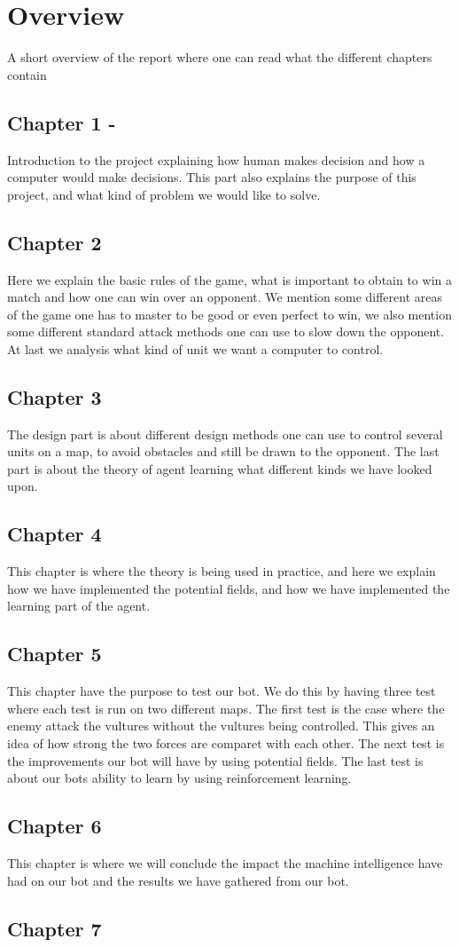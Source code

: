 \section{Overview}
	A short overview of the report where one can read what the different chapters contain

\subsection{Chapter 1 - }
Introduction to the project explaining how human makes decision and how a computer would make decisions. This part also explains the purpose of this project, and what kind of problem we would like to solve.
\subsection{Chapter 2}
Here we explain the basic rules of the game, what is important to obtain to win a match and how one can win over an opponent. We mention some different areas of the game one has to master to be good or even perfect to win, we also mention some different standard attack methods one can use to slow down the opponent. At last we analysis what kind of unit we want a computer to control.
\subsection{Chapter 3}
The design part is about different design methods one can use to control several units on a map, to avoid obstacles and still be drawn to the opponent. The last part is about the theory of agent learning what different kinds we have looked upon.
\subsection{Chapter 4}
This chapter is where the theory is being used in practice, and here we explain how we have implemented the potential fields, and how we have implemented the learning part of the agent.
\subsection{Chapter 5}
This chapter have the purpose to test our bot. We do this by having three test where each test is run on two different maps. The first test is the case
where the enemy attack the vultures without the vultures being controlled. This gives an idea of how strong the two forces are comparet with each other. The next test is the improvements our bot will have by using potential fields. The last test is about our bots ability to learn by using reinforcement learning.
\subsection{Chapter 6}
This chapter is where we will conclude the impact the machine intelligence have had on our bot and the results we have gathered from our bot.
\subsection{Chapter 7}